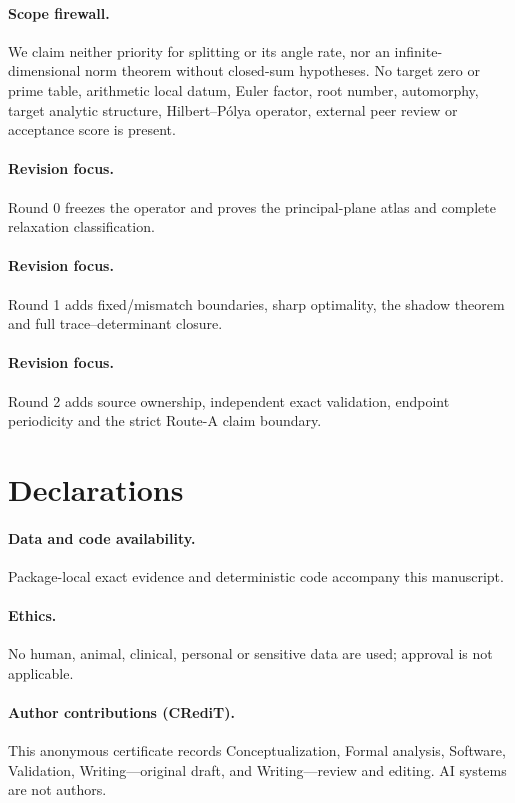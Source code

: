 \documentclass[9pt]{extarticle}
\begin{document}
\paragraph{Scope firewall.}
We claim neither priority for splitting or its angle rate, nor an
infinite-dimensional norm theorem without closed-sum hypotheses.  No target
zero or prime table, arithmetic local datum, Euler factor, root number,
automorphy, target analytic structure, Hilbert--P\'olya operator, external peer
review or acceptance score is present.
\fi

\ifcase\CRevisionRound
\paragraph{Revision focus.} Round 0 freezes the operator and proves the
principal-plane atlas and complete relaxation classification.
\or
\paragraph{Revision focus.} Round 1 adds fixed/mismatch boundaries, sharp
optimality, the shadow theorem and full trace--determinant closure.
\or
\paragraph{Revision focus.} Round 2 adds source ownership, independent exact
validation, endpoint periodicity and the strict Route-A claim boundary.
\fi

\section*{Declarations}
\paragraph{Data and code availability.} Package-local exact evidence and
deterministic code accompany this manuscript.
\paragraph{Ethics.} No human, animal, clinical, personal or sensitive data are
used; approval is not applicable.
\paragraph{Author contributions (CRediT).} This anonymous certificate records
Conceptualization, Formal analysis, Software, Validation, Writing---original
draft, and Writing---review and editing. AI systems are not authors.
\end{document}
